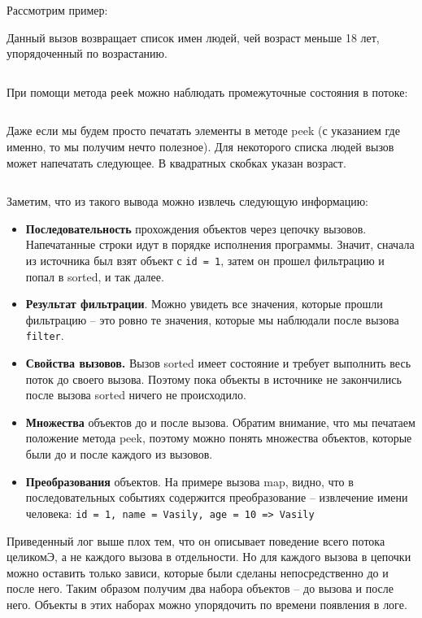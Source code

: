 Рассмотрим пример:

Данный вызов возвращает список имен людей, чей возраст меньше 18 лет, упорядоченный по возрастанию.
\inputminted{java}{chapter2/code/StreaMWithoutPeeks.java}
При помощи метода \texttt{peek} можно наблюдать промежуточные состояния в потоке:
\inputminted{java}{chapter2/code/StreamWithPeeks.java}

Даже если мы будем просто печатать элементы в методе peek (с указанием где именно, то мы получим нечто полезное). Для некоторого списка людей вызов может напечатать следующее. В квадратных скобках указан возраст. 
\inputminted{java}{chapter2/code/peekResults.txt}

Заметим, что из такого вывода можно извлечь следующую информацию:
\begin{itemize}
	\item \textbf{Последовательность} прохождения объектов через цепочку вызовов. Напечатанные строки идут в порядке исполнения программы. Значит, сначала из источника был взят объект с \texttt{id = 1}, затем он прошел фильтрацию и попал в sorted, и так далее.
	\item \textbf{Результат фильтрации}. Можно увидеть все значения, которые прошли фильтрацию -- это ровно те значения, которые мы наблюдали после вызова \texttt{filter}.
	\item \textbf{Свойства вызовов.} Вызов sorted имеет состояние и требует выполнить весь поток до своего вызова. Поэтому пока объекты в источнике не закончились после вызова sorted ничего не происходило.
	\item \textbf{Множества } объектов до и после вызова. Обратим внимание, что мы печатаем положение метода peek, поэтому можно понять множества объектов, которые были до и после каждого из вызовов.
	\item \textbf{Преобразования} объектов. На примере вызова map, видно, что в последовательных событиях содержится преобразование -- извлечение имени человека: \texttt{{id = 1, name = Vasily, age = 10} => Vasily}
\end{itemize}

Приведенный лог выше плох тем, что он описывает поведение всего потока целикомЭ, а не каждого вызова в отдельности. Но для каждого вызова в цепочки можно оставить только зависи, которые были сделаны непосредственно до и после него. Таким образом получим два набора объектов -- до вызова и после него. Объекты в этих наборах можно упорядочить по времени появления в логе. 

